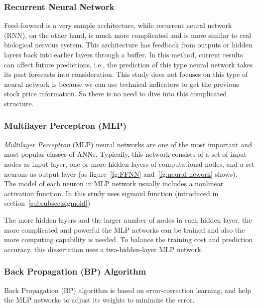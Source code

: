 \subsubsection{Recurrent Neural Network}
Feed-forward is a very sample architecture, while recurrent neural network (RNN), on the other hand, is much more complicated and is more similar to real biological nervous system. This architecture has feedback from outputs or hidden layers back into earlier layers through a buffer\cite[p.~91]{1_shadbolttaylor_2002}. In this method, current results can affect future predictions, i.e., the prediction of this type neural network takes its past forecasts into consideration. This study does not focuses on this type of neural network is because we can use technical indicators to get the previous stock price information. So there is no need to dive into this complicated structure.

\subsubsection{Multilayer Perceptron (MLP)}

\textit{Multilayer Perceptron} (MLP) neural networks are one of the most important and most popular classes of ANNs\cite[p.~213, Section~7.5]{4_kantardzic}. Typically, this network consists of a set of input nodes as input layer, one or more hidden layers of computational nodes, and a set neurons as output layer (as figure~\ref{fg:FFNN} and~\ref{fg:neural-nework} shows).\\

The model of each neuron in MLP network usually includes a nonlinear activation function. In this study uses sigmoid function (introduced in section~\ref{subsubsec:sigmoid})

The more hidden layers and the larger number of nodes in each hidden layer, the more complicated and powerful the MLP networks can be trained and also the more computing capability is needed. To balance the training cost and prediction accuracy, this dissertation uses a two-hidden-layer MLP network.

\subsubsection{Back Propagation (BP) Algorithm}
Back Propagation (BP) algorithm is based on error-correction learning, and help the MLP networks to adjust its weights to minimize the error\cite[p.~214--218]{4_kantardzic}.\\

